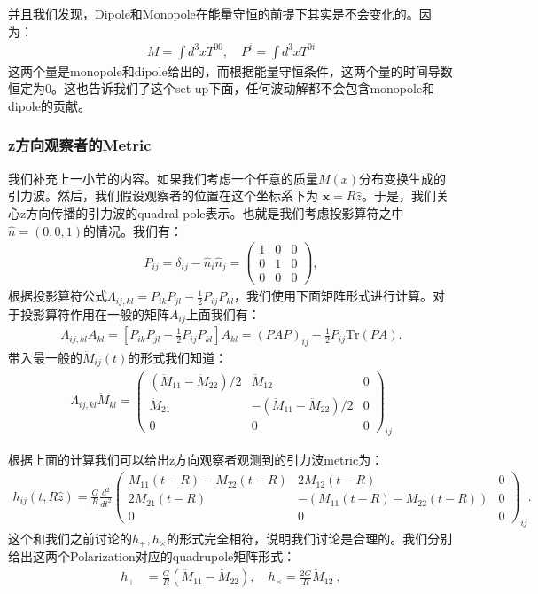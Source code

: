 并且我们发现，Dipole和Monopole在能量守恒的前提下其实是不会变化的。因为：
\begin{align}
  M = \int d^3 x T^{00}, \quad P^i = \int d^3 x T^{0i}
\end{align}
这两个量是monopole和dipole给出的，而根据能量守恒条件，这两个量的时间导数恒定为0。这也告诉我们了这个set
up下面，任何波动解都不会包含monopole和dipole的贡献。

\subsubsection{z方向观察者的Metric}

\bigskip
{}

我们补充上一小节的内容。如果我们考虑一个任意的质量$ M(x) $分布变换生成的引力波。然后，我们假设观察者的位置在这个坐标系下为 $
\mathbf{x} = R \hat{z} $。于是，我们关心z方向传播的引力波的quadral
pole表示。也就是我们考虑投影算符之中$ \hat{n} = (0,0,1) $的情况。我们有：
\begin{align}
  P_{ij} = \delta_{ij} - \hat{n}_i \hat{n}_j =
  \begin{pmatrix}1&0&0\\0&1&0\\0&0&0
  \end{pmatrix},
\end{align}
根据投影算符公式$ \Lambda_{ij,kl} = P_{ik}P_{jl} - \frac{1}{2}P_{ij}P_{kl}
$，我们使用下面矩阵形式进行计算。对于投影算符作用在一般的矩阵$ A_{ij} $上面我们有：
\begin{align}
  \Lambda_{ij,kl}A_{kl}=\left[P_{ik}P_{jl}-\frac{1}{2}P_{ij}P_{kl}\right]A_{kl}=(PAP)_{ij}-\frac{1}{2}P_{ij}\mathrm{Tr}\left(PA\right).
\end{align}
带入最一般的$ \ddot{M}_{ij}(t) $的形式我们知道：
\begin{align}
  \Lambda_{ij,kl}\ddot{M}_{kl}=
  \begin{pmatrix}(\ddot{M}_{11}-\ddot{M}_{22})/2&\ddot{M}_{12}&0\\\ddot{M}_{21}&-(\ddot{M}_{11}-\ddot{M}_{22})/2&0\\0&0&0
  \end{pmatrix}_{ij}
\end{align}

\bigskip
{}

根据上面的计算我们可以给出z方向观察者观测到的引力波metric为：
\begin{align}
  h_{ij}(t,R\hat{z})=\frac{G}{R}\frac{d^2}{dt^2}
  \begin{pmatrix}M_{11}(t-R)-M_{22}(t-R)&2M_{12}(t-R)&0\\2M_{21}(t-R)&-(M_{11}(t-R)-M_{22}(t-R))&0\\0&0&0
  \end{pmatrix}_{ij}.
\end{align}
这个和我们之前讨论的$ h_+, h_\times
$的形式完全相符，说明我们讨论是合理的。我们分别给出这两个Polarization对应的quadrupole矩阵形式：
\begin{align}\label{eq:gwquadrupolepluscross}
  h_{+}&=\frac{G}{R}\left(\ddot{M}_{11}-\ddot{M}_{22}\right), \quad
  h_{\times}=\frac{2G}{R}\ddot{M}_{12}\mathrm{~,}
\end{align}


